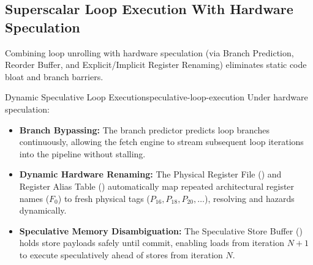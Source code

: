 \subsection{Superscalar Loop Execution With Hardware Speculation}
\label{subsec:unrolling_with_speculation}

Combining loop unrolling with hardware speculation (via Branch Prediction, Reorder Buffer, and Explicit/Implicit Register Renaming) eliminates static code bloat and branch barriers.

\begin{concept}{Dynamic Speculative Loop Execution}{speculative-loop-execution}
Under hardware speculation:
\begin{itemize}
    \item \textbf{Branch Bypassing:} The branch predictor predicts loop branches continuously, allowing the fetch engine to stream subsequent loop iterations into the pipeline without stalling.
    \item \textbf{Dynamic Hardware Renaming:} The Physical Register File () and Register Alias Table () automatically map repeated architectural register names ($F_0$) to fresh physical tags ($P_{16}, P_{18}, P_{20}, \dots$), resolving  and  hazards dynamically.
    \item \textbf{Speculative Memory Disambiguation:} The Speculative Store Buffer () holds store payloads safely until commit, enabling loads from iteration $N+1$ to execute speculatively ahead of stores from iteration $N$.
\end{itemize}
\end{concept}

